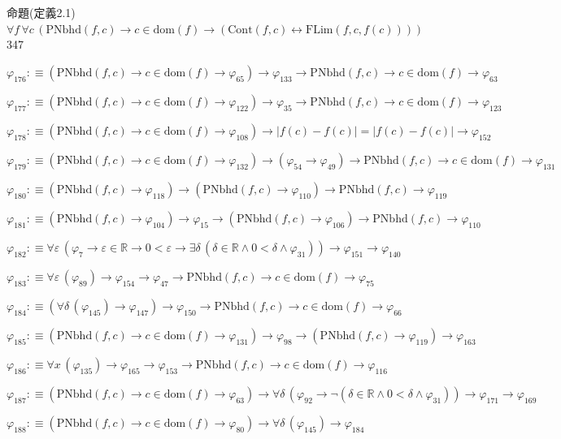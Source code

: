 \begin{fullproof}{命題(定義2.1)}{$\forall f\,\forall c\,(\mathrm{PNbhd}(f,c) \to c \in \mathrm{dom}(f) \to (\mathrm{Cont}(f,c) \leftrightarrow \mathrm{FLim}(f,c,f(c))))$}{347}
\begin{abbrevlist}
\item $\varphi_{176} :\equiv (\mathrm{PNbhd}(f,c) \to c \in \mathrm{dom}(f) \to \varphi_{65}) \to \varphi_{133} \to \mathrm{PNbhd}(f,c) \to c \in \mathrm{dom}(f) \to \varphi_{63}$
\item $\varphi_{177} :\equiv (\mathrm{PNbhd}(f,c) \to c \in \mathrm{dom}(f) \to \varphi_{122}) \to \varphi_{35} \to \mathrm{PNbhd}(f,c) \to c \in \mathrm{dom}(f) \to \varphi_{123}$
\item $\varphi_{178} :\equiv (\mathrm{PNbhd}(f,c) \to c \in \mathrm{dom}(f) \to \varphi_{108}) \to \lvert f(c) - f(c) \rvert = \lvert f(c) - f(c) \rvert \to \varphi_{152}$
\item $\varphi_{179} :\equiv (\mathrm{PNbhd}(f,c) \to c \in \mathrm{dom}(f) \to \varphi_{132}) \to (\varphi_{54} \to \varphi_{49}) \to \mathrm{PNbhd}(f,c) \to c \in \mathrm{dom}(f) \to \varphi_{131}$
\item $\varphi_{180} :\equiv (\mathrm{PNbhd}(f,c) \to \varphi_{118}) \to (\mathrm{PNbhd}(f,c) \to \varphi_{110}) \to \mathrm{PNbhd}(f,c) \to \varphi_{119}$
\item $\varphi_{181} :\equiv (\mathrm{PNbhd}(f,c) \to \varphi_{104}) \to \varphi_{15} \to (\mathrm{PNbhd}(f,c) \to \varphi_{106}) \to \mathrm{PNbhd}(f,c) \to \varphi_{110}$
\item $\varphi_{182} :\equiv \forall \varepsilon\,(\varphi_{7} \to \varepsilon \in \mathbb{R} \to 0 < \varepsilon \to \exists \delta\,(\delta \in \mathbb{R} \land 0 < \delta \land \varphi_{31})) \to \varphi_{151} \to \varphi_{140}$
\item $\varphi_{183} :\equiv \forall \varepsilon\,(\varphi_{89}) \to \varphi_{154} \to \varphi_{47} \to \mathrm{PNbhd}(f,c) \to c \in \mathrm{dom}(f) \to \varphi_{75}$
\item $\varphi_{184} :\equiv (\forall \delta\,(\varphi_{145}) \to \varphi_{147}) \to \varphi_{150} \to \mathrm{PNbhd}(f,c) \to c \in \mathrm{dom}(f) \to \varphi_{66}$
\item $\varphi_{185} :\equiv (\mathrm{PNbhd}(f,c) \to c \in \mathrm{dom}(f) \to \varphi_{131}) \to \varphi_{98} \to (\mathrm{PNbhd}(f,c) \to \varphi_{119}) \to \varphi_{163}$
\item $\varphi_{186} :\equiv \forall x\,(\varphi_{135}) \to \varphi_{165} \to \varphi_{153} \to \mathrm{PNbhd}(f,c) \to c \in \mathrm{dom}(f) \to \varphi_{116}$
\item $\varphi_{187} :\equiv (\mathrm{PNbhd}(f,c) \to c \in \mathrm{dom}(f) \to \varphi_{63}) \to \forall \delta\,(\varphi_{92} \to \neg (\delta \in \mathbb{R} \land 0 < \delta \land \varphi_{31})) \to \varphi_{171} \to \varphi_{169}$
\item $\varphi_{188} :\equiv (\mathrm{PNbhd}(f,c) \to c \in \mathrm{dom}(f) \to \varphi_{80}) \to \forall \delta\,(\varphi_{145}) \to \varphi_{184}$
\end{abbrevlist}
\end{fullproof}
